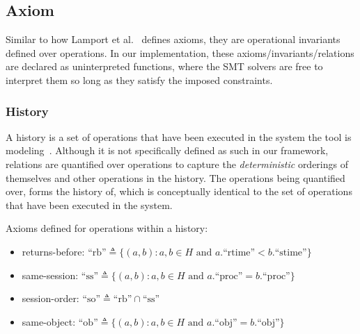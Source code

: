 \subsection{Axiom}

%
%
Similar to how Lamport et al.~\cite{lamport1977proving} defines axioms, they are
operational invariants defined over operations. In our implementation, these
axioms/invariants/relations are declared as uninterpreted functions, where the
SMT solvers are free to interpret them so long as they satisfy the imposed
constraints.

\subsubsection{History}

%
%

A history is a set of operations that have been executed in the system the tool
is modeling~\cite{viotti2016consistency}. Although it is not
specifically defined as
such in our framework, relations are quantified over operations to capture the
\textit{deterministic} orderings of themselves and other operations
in the history. The
operations being quantified over, forms the history of, which is conceptually
identical to the set of operations that have been executed in the system.

Axioms defined for operations within a history:

\begin{itemize}
  \item returns-before: $\text{``rb''} \triangleq \{(a, b) : a, b \in
    H \text{ and } a.\text{``rtime''} < b.\text{``stime''}\}$

  \item same-session: $\text{``ss''} \triangleq \{(a, b) : a, b \in H
    \text{ and } a.\text{``proc''} = b.\text{``proc''}\}$

  \item session-order: $\text{``so''} \triangleq \text{``rb''} \cap
    \text{``ss''}$

  \item same-object: $\text{``ob''} \triangleq \{(a, b) : a, b \in H
    \text{ and } a.\text{``obj''} = b.\text{``obj''}\}$
\end{itemize}

